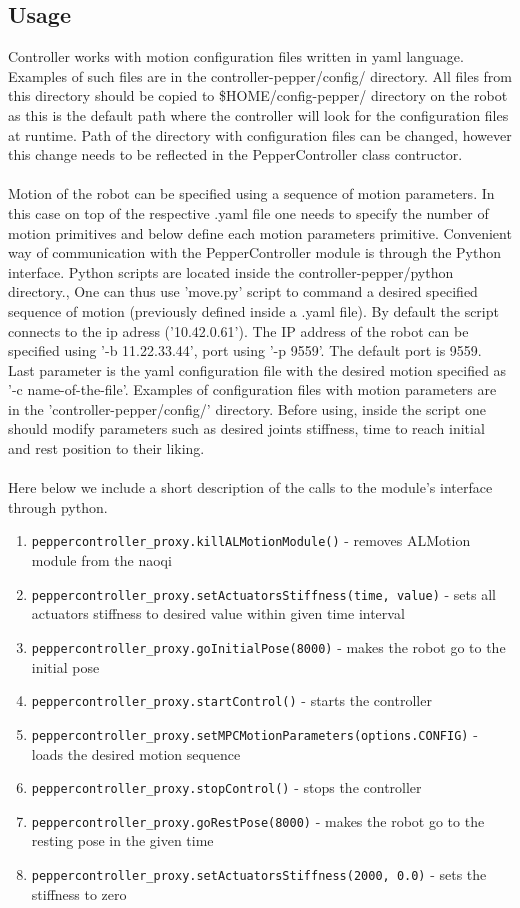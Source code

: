 \subsection{Usage}
\noindent Controller works with motion configuration files written in yaml language. Examples of such files are in the
controller-pepper/config/ directory. All files from this directory should be copied to \$HOME/config-pepper/ 
directory on the robot as this is the default path where the controller will look for the configuration files 
at runtime. Path of the directory with configuration files can be changed, however this change needs to be reflected in
the PepperController class contructor.\\ \\
\noindent Motion of the robot can be specified using a sequence of motion parameters. In this case on top of the
respective .yaml file one needs to specify the number of motion primitives and below define each motion parameters
primitive.
\noindent Convenient way of communication with the PepperController module is through the Python interface. Python scripts are located
inside the controller-pepper/python directory., One can thus use 'move.py' script to command a desired specified
sequence of motion (previously defined inside a .yaml file). By default the script connects to the ip adress
('10.42.0.61'). The IP address of the robot can be specified using '-b 11.22.33.44', port using '-p 9559'. The default
port is 9559. Last parameter is the yaml configuration file with the desired motion specified as '-c name-of-the-file'.
Examples of configuration files with motion parameters are in the 'controller-pepper/config/' directory. Before using,
inside the script one should modify parameters such as desired joints stiffness, time to reach initial and rest position
to their liking.\\ \\

\noindent Here below we include a short description of the calls to the module's interface through python.
\begin{enumerate}
\item \texttt{peppercontroller\_proxy.killALMotionModule()} - removes ALMotion module from the naoqi
\item \texttt{peppercontroller\_proxy.setActuatorsStiffness(time, value)} - sets all actuators stiffness to desired
value within given time interval
\item \texttt{peppercontroller\_proxy.goInitialPose(8000)} - makes the robot go to the initial pose
\item \texttt{peppercontroller\_proxy.startControl()} - starts the controller
\item \texttt{peppercontroller\_proxy.setMPCMotionParameters(options.CONFIG)} - loads the desired motion sequence
\item \texttt{peppercontroller\_proxy.stopControl()} - stops the controller
\item \texttt{peppercontroller\_proxy.goRestPose(8000)} - makes the robot go to the resting pose in the given time
\item \texttt{peppercontroller\_proxy.setActuatorsStiffness(2000, 0.0)} - sets the stiffness to zero
\end{enumerate}

